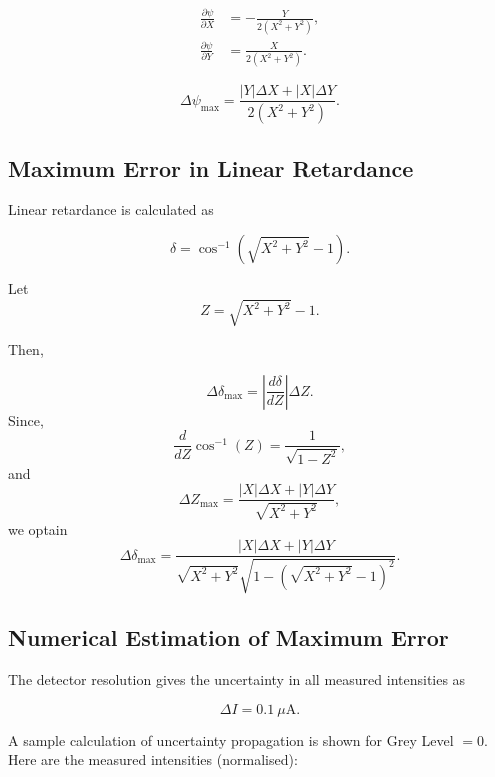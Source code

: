 \begin{subequations}
    \begin{align}
    \frac{\partial \psi}{\partial X}
    &=
    -\frac{Y}{2(X^2+Y^2)},\\
    \frac{\partial \psi}{\partial Y}
    &=
    \frac{X}{2(X^2+Y^2)}.
    \end{align}
\end{subequations}

\begin{equation}
\boxed{
\Delta\psi_{\max}
=
\frac{|Y|\Delta X + |X|\Delta Y}
{2(X^2+Y^2)}.
}
\end{equation}

\subsection{Maximum Error in Linear Retardance}

Linear retardance is calculated as

\begin{equation}
\delta=\cos^{-1}\left(\sqrt{X^2+Y^2}-1\right).
\end{equation}

Let
\[
Z=\sqrt{X^2+Y^2}-1.
\]

Then,

\begin{equation}
\Delta\delta_{\max}
=
\left|\frac{d\delta}{dZ}\right|\Delta Z.
\end{equation}
Since,
\[
\frac{d}{dZ}\cos^{-1}(Z)
=
\frac{1}{\sqrt{1-Z^2}},
\]
and 
\[
\Delta Z_{\max}
=
\frac{|X|\Delta X + |Y|\Delta Y}
{\sqrt{X^2+Y^2}},
\]
we optain
\begin{equation}
\boxed{
\Delta\delta_{\max}
=
\frac{|X|\Delta X + |Y|\Delta Y}
{\sqrt{X^2+Y^2}\sqrt{1-(\sqrt{X^2+Y^2}-1)^2}}.
}
\end{equation}

\subsection{Numerical Estimation of Maximum Error}

The detector resolution gives the uncertainty in all measured
intensities as

\begin{equation}
\Delta I = 0.1~\mu\text{A}.
\end{equation}

\noindent A sample calculation of uncertainty propagation is shown for Grey Level $=0$. Here are the measured intensities (normalised):

